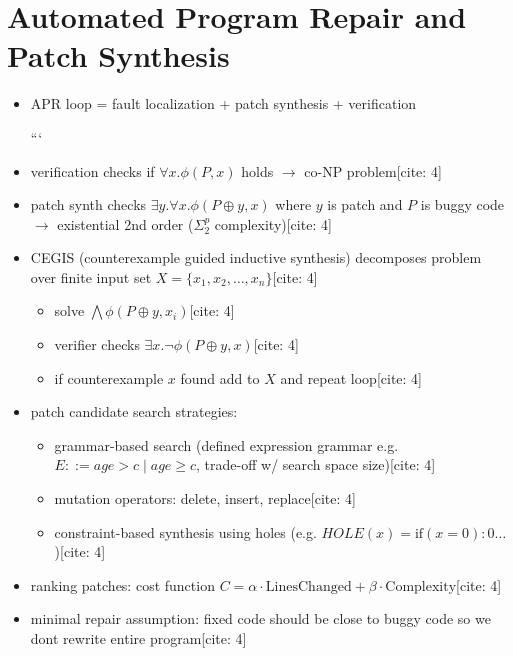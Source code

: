 
\setcounter{chapter}{5}
\chapter{Automated Program Repair and Patch Synthesis}

\begin{itemize}
\item APR loop = fault localization + patch synthesis + verification

```
\item verification checks if $\forall x.\phi(P,x)$ holds $\rightarrow$ co-NP problem[cite: 4]

\item patch synth checks $\exists y.\forall x.\phi(P\oplus y,x)$ where $y$ is patch and $P$ is buggy code $\rightarrow$ existential 2nd order ($\Sigma_2^p$ complexity)[cite: 4]

\item CEGIS (counterexample guided inductive synthesis) decomposes problem over finite input set $X=\{x_1,x_2,\dots,x_n\}$[cite: 4]
\begin{itemize}
    \item solve $\bigwedge \phi(P\oplus y, x_i)$[cite: 4]
    \item verifier checks $\exists x.\neg \phi(P\oplus y, x)$[cite: 4]
    \item if counterexample $x$ found add to $X$ and repeat loop[cite: 4]
\end{itemize}

\item patch candidate search strategies:
\begin{itemize}
    \item grammar-based search (defined expression grammar e.g. $E ::= age > c \mid age \ge c$, trade-off w/ search space size)[cite: 4]
    \item mutation operators: delete, insert, replace[cite: 4]
    \item constraint-based synthesis using holes (e.g. $HOLE(x) = \text{if}(x=0):0 \dots$)[cite: 4]
\end{itemize}

\item ranking patches: cost function $C = \alpha \cdot \text{LinesChanged} + \beta \cdot \text{Complexity}$[cite: 4]

\item minimal repair assumption: fixed code should be close to buggy code so we dont rewrite entire program[cite: 4]


\end{itemize}
